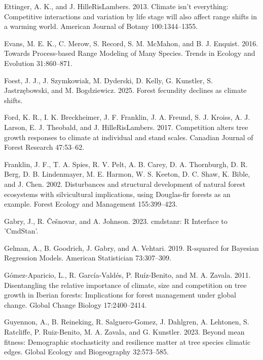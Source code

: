 \documentclass[12pt]{article}
\newlength{\cslhangindent}
\newenvironment{cslreferences}%
  {\setlength{\parindent}{0pt}%
  \everypar{\setlength{\hangindent}{\cslhangindent}}\ignorespaces}%
  {\par}
\begin{document}
\begin{cslreferences}
\leavevmode\hypertarget{ref-Ettinger2013}{}%
Ettinger, A. K., and J. HilleRisLambers. 2013. Climate isn't everything:
Competitive interactions and variation by life stage will also affect
range shifts in a warming world. American Journal of Botany
100:1344--1355.

\leavevmode\hypertarget{ref-Evans2016}{}%
Evans, M. E. K., C. Merow, S. Record, S. M. McMahon, and B. J. Enquist.
2016. Towards Process-based Range Modeling of Many Species. Trends in
Ecology and Evolution 31:860--871.

\leavevmode\hypertarget{ref-foest2025forest}{}%
Foest, J. J., J. Szymkowiak, M. Dyderski, D. Kelly, G. Kunstler, S.
Jastrzębowski, and M. Bogdziewicz. 2025. Forest fecundity declines as
climate shifts.

\leavevmode\hypertarget{ref-Ford2017}{}%
Ford, K. R., I. K. Breckheimer, J. F. Franklin, J. A. Freund, S. J.
Kroiss, A. J. Larson, E. J. Theobald, and J. HilleRisLambers. 2017.
Competition alters tree growth responses to climate at individual and
stand scales. Canadian Journal of Forest Research 47:53--62.

\leavevmode\hypertarget{ref-Franklin2002}{}%
Franklin, J. F., T. A. Spies, R. V. Pelt, A. B. Carey, D. A. Thornburgh,
D. R. Berg, D. B. Lindenmayer, M. E. Harmon, W. S. Keeton, D. C. Shaw,
K. Bible, and J. Chen. 2002. Disturbances and structural development of
natural forest ecosystems with silvicultural implications, using
Douglas-fir forests as an example. Forest Ecology and Management
155:399--423.

\leavevmode\hypertarget{ref-cmdstanr}{}%
Gabry, J., R. Češnovar, and A. Johnson. 2023. cmdstanr: R Interface to
'CmdStan'.

\leavevmode\hypertarget{ref-Gelman2019}{}%
Gelman, A., B. Goodrich, J. Gabry, and A. Vehtari. 2019. R-squared for
Bayesian Regression Models. American Statistician 73:307--309.

\leavevmode\hypertarget{ref-GomezAparicio2011}{}%
Gómez-Aparicio, L., R. García-Valdés, P. Ruíz-Benito, and M. A. Zavala.
2011. Disentangling the relative importance of climate, size and
competition on tree growth in Iberian forests: Implications for forest
management under global change. Global Change Biology 17:2400--2414.

\leavevmode\hypertarget{ref-Guyennon2023}{}%
Guyennon, A., B. Reineking, R. Salguero-Gomez, J. Dahlgren, A. Lehtonen,
S. Ratcliffe, P. Ruiz-Benito, M. A. Zavala, and G. Kunstler. 2023.
Beyond mean fitness: Demographic stochasticity and resilience matter at
tree species climatic edges. Global Ecology and Biogeography
32:573--585.


\end{cslreferences}
\end{document}
